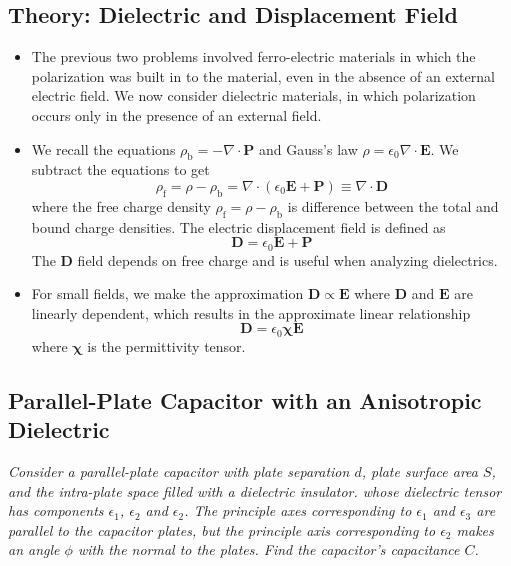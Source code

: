 \documentclass[11pt, a4paper]{article}
\renewcommand{\vec}[1]{\bm{#1}} %
\newcommand{\E}{\vec{E}}  %
\newcommand{\D}{\vec{D}}  %
\newcommand{\e}{\epsilon}
\newcommand{\ee}{\epsilon_{0}}  %
\newcommand{\eee}{\bm{\chi}}  %
\renewcommand{\P}{\vec{P}}  %
\renewcommand{\div}{\nabla \cdot}
\begin{document}
\subsection{Theory: Dielectric and Displacement Field}
\begin{itemize}
		\item The previous two problems involved ferro-electric materials in which the polarization was built in to the material, even in the absence of an external electric field. We now consider dielectric materials, in which polarization occurs only in the presence of an external field. 
		
		\item We recall the equations $ \rho_{\text{b}} = - \div \P $ and Gauss's law $ \rho = \ee \div \E $. We subtract the equations to get
		\begin{equation*}
			\rho_{\text{f}} = \rho - \rho_{\text{b}} = \div (\ee \E + \P) \equiv \div \D
		\end{equation*}
		where the free charge density $ \rho_{\text{f}} = \rho - \rho_{\text{b}} $ is difference between the total and bound charge densities. The electric displacement field is defined as
		\begin{equation*}
			\D = \ee \E + \P
		\end{equation*}
		The $ \D $ field depends on free charge and is useful when analyzing dielectrics.
		
		\item For small fields, we make the approximation $ \D \propto \E $ where $ \D $ and $ \E $ are linearly dependent, which results in the approximate linear relationship 
		\begin{equation*}
			\D = \ee \eee \E
		\end{equation*}
		where $ \eee $ is the permittivity tensor.
\end{itemize}

\subsection{Parallel-Plate Capacitor with an Anisotropic Dielectric}
\textit{Consider a parallel-plate capacitor with plate separation $ d $, plate surface area $ S $, and the intra-plate space filled with a dielectric insulator. whose dielectric tensor has components $ \e_{1} $, $ \e_{2} $ and $ \e_{2} $. The principle axes corresponding to $ \e_{1} $ and $ \e_{3} $ are parallel to the capacitor plates, but the principle axis corresponding to $ \e_{2} $ makes an angle $ \phi $ with the normal to the plates. Find the capacitor's capacitance $ C $.}
\end{document}
